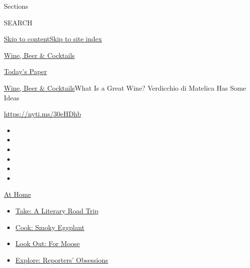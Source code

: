 Sections

SEARCH

\protect\hyperlink{site-content}{Skip to
content}\protect\hyperlink{site-index}{Skip to site index}

\href{https://www.nytimes3xbfgragh.onion/section/food/drinks}{Wine, Beer
\& Cocktails}

\href{https://myaccount.nytimes3xbfgragh.onion/auth/login?response_type=cookie\&client_id=vi}{}

\href{https://www.nytimes3xbfgragh.onion/section/todayspaper}{Today's
Paper}

\href{/section/food/drinks}{Wine, Beer \& Cocktails}\textbar{}What Is a
Great Wine? Verdicchio di Matelica Has Some Ideas

\url{https://nyti.ms/30eHDhb}

\begin{itemize}
\item
\item
\item
\item
\item
\item
\end{itemize}

\href{https://www.nytimes3xbfgragh.onion/spotlight/at-home?action=click\&pgtype=Article\&state=default\&region=TOP_BANNER\&context=at_home_menu}{At
Home}

\begin{itemize}
\tightlist
\item
  \href{https://www.nytimes3xbfgragh.onion/2020/07/28/books/time-for-a-literary-road-trip.html?action=click\&pgtype=Article\&state=default\&region=TOP_BANNER\&context=at_home_menu}{Take:
  A Literary Road Trip}
\item
  \href{https://www.nytimes3xbfgragh.onion/2020/07/29/magazine/bored-with-your-home-cooking-some-smoky-eggplant-will-fix-that.html?action=click\&pgtype=Article\&state=default\&region=TOP_BANNER\&context=at_home_menu}{Cook:
  Smoky Eggplant}
\item
  \href{https://www.nytimes3xbfgragh.onion/2020/07/27/travel/moose-michigan-isle-royale.html?action=click\&pgtype=Article\&state=default\&region=TOP_BANNER\&context=at_home_menu}{Look
  Out: For Moose}
\item
  \href{https://www.nytimes3xbfgragh.onion/interactive/2020/at-home/even-more-reporters-editors-diaries-lists-recommendations.html?action=click\&pgtype=Article\&state=default\&region=TOP_BANNER\&context=at_home_menu}{Explore:
  Reporters' Obsessions}
\end{itemize}

